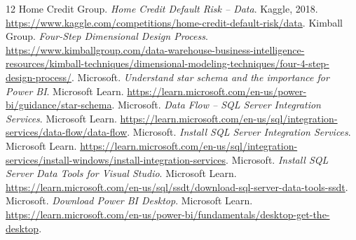 \documentclass[12pt,a4paper,oneside]{report}
\begin{document}
\begin{thebibliography}{12}
 Home Credit Group. \emph{Home Credit Default Risk -- Data}. Kaggle, 2018. \url{https://www.kaggle.com/competitions/home-credit-default-risk/data}.
 Kimball Group. \emph{Four-Step Dimensional Design Process}. \url{https://www.kimballgroup.com/data-warehouse-business-intelligence-resources/kimball-techniques/dimensional-modeling-techniques/four-4-step-design-process/}.
 Microsoft. \emph{Understand star schema and the importance for Power BI}. Microsoft Learn. \url{https://learn.microsoft.com/en-us/power-bi/guidance/star-schema}.
 Microsoft. \emph{Data Flow -- SQL Server Integration Services}. Microsoft Learn. \url{https://learn.microsoft.com/en-us/sql/integration-services/data-flow/data-flow}.
 Microsoft. \emph{Install SQL Server Integration Services}. Microsoft Learn. \url{https://learn.microsoft.com/en-us/sql/integration-services/install-windows/install-integration-services}.
 Microsoft. \emph{Install SQL Server Data Tools for Visual Studio}. Microsoft Learn. \url{https://learn.microsoft.com/en-us/sql/ssdt/download-sql-server-data-tools-ssdt}.
 Microsoft. \emph{Download Power BI Desktop}. Microsoft Learn. \url{https://learn.microsoft.com/en-us/power-bi/fundamentals/desktop-get-the-desktop}.
\end{thebibliography}
\end{document}
